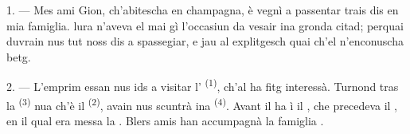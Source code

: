 %
%
%
%
%
%

\VUsaut{4.0mm}
\VUsaut{3.0mm}

\VUsaut{3.0mm}

1. --- Mes ami Gion, ch'abitescha en champagna, è vegnì a passentar trais dis en mia
famiglia.  lura n'aveva el mai gì l'occasiun da vesair ina gronda citad;
perquai duvrain nus tut noss dis a spassegiar, e jau al explitgesch quai ch'el
n'enconuscha betg.

2. --- L'emprim essan nus ids a visitar l' \textsuperscript{(1)}, ch'al
ha fitg interessà. Turnond tras la  \textsuperscript{(3)} nua ch'è il  \textsuperscript{(2)}, avain nus scuntrà ina  \textsuperscript{(4)}.
Avant
il  ha ì il , che precedeva il , en il qual era messa la . Blers amis han accumpagnà la famiglia
.

